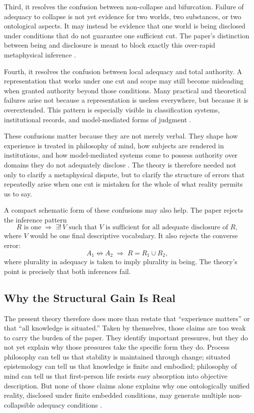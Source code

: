 \documentclass[11pt]{article}
\begin{document}
Third, it resolves the confusion between non-collapse and bifurcation. Failure of adequacy to collapse is not yet evidence for two worlds, two substances, or two ontological aspects. It may instead be evidence that one world is being disclosed under conditions that do not guarantee one sufficient cut. The paper's distinction between being and disclosure is meant to block exactly this over-rapid metaphysical inference \cite{Nagel1986,Haraway1988}.

Fourth, it resolves the confusion between local adequacy and total authority. A representation that works under one cut and scope may still become misleading when granted authority beyond those conditions. Many practical and theoretical failures arise not because a representation is useless everywhere, but because it is overextended. This pattern is especially visible in classification systems, institutional records, and model-mediated forms of judgment \cite{BowkerStar1999,ONeil2016,Eubanks2018,ObermeyerEtAl2019}.

These confusions matter because they are not merely verbal. They shape how experience is treated in philosophy of mind, how subjects are rendered in institutions, and how model-mediated systems come to possess authority over domains they do not adequately disclose \cite{Fricker2007,BowkerStar1999,Hacking1995}. The theory is therefore needed not only to clarify a metaphysical dispute, but to clarify the structure of errors that repeatedly arise when one cut is mistaken for the whole of what reality permits us to say.

A compact schematic form of these confusions may also help. The paper rejects the inference pattern
\[
R \text{ is one} \;\Rightarrow\; \exists !\,V \text{ such that } V \text{ is sufficient for all adequate disclosure of } R,
\]
where \(V\) would be one final descriptive vocabulary. It also rejects the converse error:
\[
A_1 \not\leftrightarrow A_2 \;\Rightarrow\; R = R_1 \cup R_2,
\]
where plurality in adequacy is taken to imply plurality in being. The theory's point is precisely that both inferences fail.

\subsection{Why the Structural Gain Is Real}

The present theory therefore does more than restate that ``experience matters'' or that ``all knowledge is situated.'' Taken by themselves, those claims are too weak to carry the burden of the paper. They identify important pressures, but they do not yet explain why those pressures take the specific form they do. Process philosophy can tell us that stability is maintained through change; situated epistemology can tell us that knowledge is finite and embodied; philosophy of mind can tell us that first-person life resists easy absorption into objective description. But none of those claims alone explains why one ontologically unified reality, disclosed under finite embedded conditions, may generate multiple non-collapsible adequacy conditions \cite{Whitehead1978,Rescher1996,Haraway1988,Nagel1974,Levine1983}.
\end{document}
